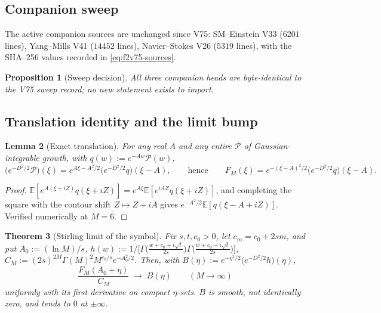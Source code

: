 \documentclass[11pt]{article}
\newtheorem{theorem}{Theorem}[section]
\newtheorem{proposition}[theorem]{Proposition}
\newtheorem{lemma}[theorem]{Lemma}
\theoremstyle{definition}
\theoremstyle{remark}
\begin{document}
\subsection{Companion sweep}

The active companion sources are unchanged since V75: SM--Einstein V33
(\(6201\) lines), Yang--Mills V41 (\(14452\) lines), Navier--Stokes V26
(\(5319\) lines), with the SHA--256 values recorded in
\eqref{eq:f2v75-sources}.

\begin{proposition}[Sweep decision]
\label{prop:f2v80-sweep}
All three companion heads are byte-identical to the V75 sweep record;
no new statement exists to import.
\end{proposition}

\subsection{Translation identity and the limit bump}

\begin{lemma}[Exact translation]
\label{lem:f2v80-translation}
For any real \(A\) and any entire \(\mathcal P\) of Gaussian-integrable
growth, with \(q(w):=e^{-Aw}\mathcal P(w)\),
\begin{equation}
 \bigl(e^{-D^2/2}\mathcal P\bigr)(\xi)=e^{A\xi-A^2/2}\bigl(e^{-D^2/2}q\bigr)(\xi-A),
 \qquad\text{hence}\qquad
 F_M(\xi)=e^{-(\xi-A)^2/2}\bigl(e^{-D^2/2}q\bigr)(\xi-A).
 \label{eq:f2v80-translation}
\end{equation}
\end{lemma}

\begin{proof}
\(\mathbb E[e^{A(\xi+iZ)}q(\xi+iZ)]=e^{A\xi}\mathbb E[e^{iAZ}q(\xi+iZ)]\),
and completing the square with the contour shift \(Z\mapsto Z+iA\)
gives \(e^{-A^2/2}\mathbb E[q(\xi-A+iZ)]\).  Verified numerically at
\(M=6\).
\end{proof}

\begin{theorem}[Stirling limit of the symbol]
\label{thm:f2v80-limit}
Fix \(s,t,c_0>0\), let \(c_m=c_0+2sm\), and put \(A_0:=(\ln M)/s\),
\(h(w):=1/\bigl[\Gamma\bigl(\tfrac{w+c_0+i\sqrt t}{2s}\bigr)\Gamma\bigl(\tfrac{w+c_0-i\sqrt t}{2s}\bigr)\bigr]\),
\(C_M:=(2s)^{2M}\Gamma(M)^2M^{c_0/s}e^{-A_0^2/2}\).  Then, with
\(B(\eta):=e^{-\eta^2/2}\bigl(e^{-D^2/2}h\bigr)(\eta)\),
\begin{equation}
 \frac{F_M(A_0+\eta)}{C_M}\;\longrightarrow\;B(\eta)
 \qquad(M\to\infty)
 \label{eq:f2v80-limit}
\end{equation}
uniformly with its first derivative on compact \(\eta\)-sets.  \(B\) is
smooth, not identically zero, and tends to \(0\) at \(\pm\infty\).
\end{theorem}
\end{document}

